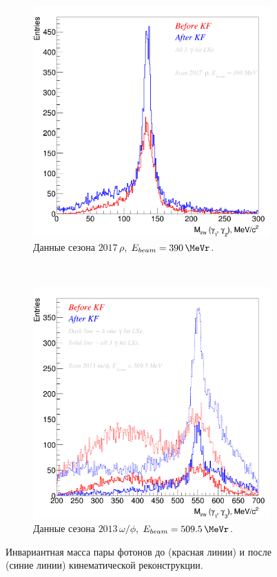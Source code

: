 \begin{figure}[htbp]
    \centering
    \begin{subfigure}[b]{0.45\textwidth}
        \includegraphics[width=\textwidth]{img/kf_mpi0_at_omega.png}
        \caption{Данные сезона $2017 \, \rho$, $E_{beam} = \SI{390}{\MeVr}$.}
        \label{fig:raskl_rho389}
    \end{subfigure}
    ~
    \begin{subfigure}[b]{0.45\textwidth}
        \includegraphics[width=\textwidth]{img/kf_meta_at_phi.png}
        \caption{Данные сезона $2013 \, \omega / \phi$, $E_{beam} = \SI{509.5}{\MeVr}$.}
        \label{fig:raskl_sim391_54}
    \end{subfigure}
    \caption{Инвариантная масса пары фотонов до (красная линии) и после (синие линии) кинематической реконструкции.}
    \label{fig:raskl}
\end{figure}


